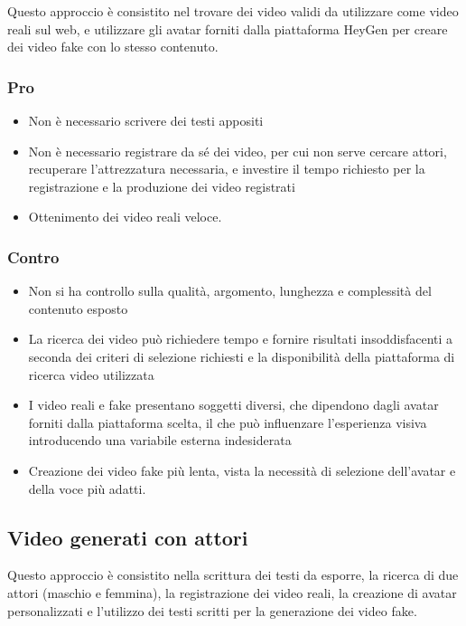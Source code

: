 Questo approccio è consistito nel trovare dei video validi da utilizzare come video reali sul web, e utilizzare gli avatar forniti dalla piattaforma HeyGen per creare dei video fake con lo stesso contenuto.

\subsubsection{Pro}

\begin{itemize}
    \item Non è necessario scrivere dei testi appositi
    \item Non è necessario registrare da sé dei video, per cui non serve cercare attori, recuperare l'attrezzatura necessaria, e investire il tempo richiesto per la registrazione e la produzione dei video registrati
    \item Ottenimento dei video reali veloce.
\end{itemize}

\subsubsection{Contro}

\begin{itemize}
    \item Non si ha controllo sulla qualità, argomento, lunghezza e complessità del contenuto esposto
    \item La ricerca dei video può richiedere tempo e fornire risultati insoddisfacenti a seconda dei criteri di selezione richiesti e la disponibilità della piattaforma di ricerca video utilizzata
    \item I video reali e fake presentano soggetti diversi, che dipendono dagli avatar forniti dalla piattaforma scelta, il che può influenzare l'esperienza visiva introducendo una variabile esterna indesiderata
    \item Creazione dei video fake più lenta, vista la necessità di selezione dell'avatar e della voce più adatti.
\end{itemize}

\subsection{Video generati con attori}

Questo approccio è consistito nella scrittura dei testi da esporre, la ricerca di due attori (maschio e femmina), la registrazione dei video reali, la creazione di avatar personalizzati e l'utilizzo dei testi scritti per la generazione dei video fake.

